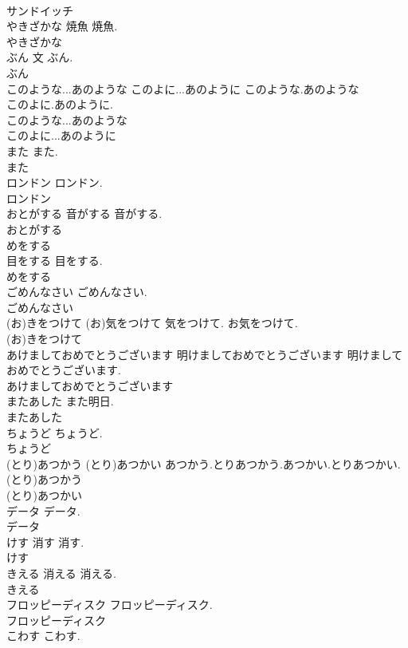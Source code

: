 \documentclass[8pt]{extreport}
\begin{document}
\begin{CJK}{UTF8}{min}
\\	サンドイッチ
\\	やきざかな	焼魚	焼魚.	
\\	やきざかな
\\	ぶん	文	ぶん.	
\\	ぶん
\\	このような...あのような このよに...あのように		このような.あのような
\\	このよに.あのように.	
\\	このような...あのような
\\	このよに...あのように
\\	また		また.	
\\	また
\\	ロンドン		ロンドン.	
\\	ロンドン
\\	おとがする	音がする	音がする.	
\\	おとがする
\\	めをする	
\\	目をする	目をする.	
\\	めをする
\\	ごめんなさい		ごめんなさい.	
\\	ごめんなさい
\\	(お)きをつけて	(お)気をつけて	気をつけて. お気をつけて.	
\\	(お)きをつけて
\\	あけましておめでとうございます	明けましておめでとうございます	明けましておめでとうございます.	
\\	あけましておめでとうございます
\\	またあした		また明日.	
\\	またあした
\\	ちょうど		ちょうど.	
\\	ちょうど
\\	(とり)あつかう (とり)あつかい		あつかう.とりあつかう.あつかい.とりあつかい.	
\\	(とり)あつかう
\\	(とり)あつかい
\\	データ		データ.	
\\	データ
\\	けす	消す	消す.	
\\	けす
\\	きえる	消える	消える.	
\\	きえる
\\	フロッピーディスク		フロッピーディスク.	
\\	フロッピーディスク
\\	こわす		こわす.	

\end{CJK}
\end{document}
